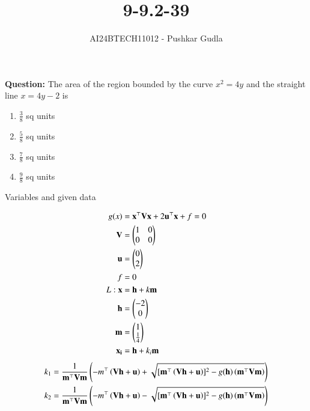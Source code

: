 \documentclass[journal]{IEEEtran}
\begin{document}

\vspace{3cm}

\title{9-9.2-39}
\author{AI24BTECH11012 - Pushkar Gudla}
{\let\newpage\relax\maketitle}

\renewcommand{\thefigure}{\theenumi}
\renewcommand{\thetable}{\theenumi}
\setlength{\intextsep}{10pt} %


\renewcommand{\thetable}{\theenumi}
\textbf{Question:} The area of the region bounded by the curve $x^2 = 4y$ and the straight line $x = 4y-2$ is
\begin{enumerate}
\item $\frac{3}{8}$ sq units
\item $\frac{5}{8}$ sq units
\item $\frac{7}{8}$ sq units
\item $\frac{9}{8}$ sq units
\end{enumerate}
\solution
\begin{table}[h!]    
  \centering
  
  \caption{Variables and given data}
  \label{tab 3.2.15}
\end{table}
\begin{align}
	g(x) &= \mathbf{x}^\top \mathbf{V}\mathbf{x}+2\mathbf{u}^\top \mathbf{x}+f=0\\
	\mathbf{V} &= \begin{pmatrix}1 & 0\\0 & 0\end{pmatrix}\\
	\mathbf{u} &= \begin{pmatrix}0\\2\end{pmatrix}\\
	f &= 0\\
	L: \mathbf{x} &= \mathbf{h}+k\mathbf{m} \\
	\mathbf{h} &= \begin{pmatrix}-2 \\ 0\end{pmatrix}\\
	\mathbf{m} &= \begin{pmatrix}1 \\ \frac{1}{4}\end{pmatrix}\\
	\mathbf{x_i} &= \mathbf{h}+k_{i}\mathbf{m}
\end{align}
\begin{align}
	k_1 &= \frac{1}{\mathbf{m}^\top \mathbf{V}\mathbf{m}}\left(-m^\top\left(\mathbf{V}\mathbf{h}+\mathbf{u}\right)+ \sqrt{[\mathbf{m}^\top \left(\mathbf{V}\mathbf{h}+\mathbf{u}\right)]^2 - g(\mathbf{h})\left(\mathbf{m}^\top\mathbf{V}\mathbf{m}\right)}\right) \\
	k_2 &= \frac{1}{\mathbf{m}^\top \mathbf{V}\mathbf{m}}\left(-m^\top\left(\mathbf{V}\mathbf{h}+\mathbf{u}\right)- \sqrt{[\mathbf{m}^\top \left(\mathbf{V}\mathbf{h}+\mathbf{u}\right)]^2 - g(\mathbf{h})\left(\mathbf{m}^\top\mathbf{V}\mathbf{m}\right)}\right)
\end{align}
\end{document}
